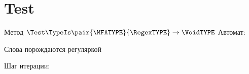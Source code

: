 \section{Test}
\begin{frame}{Метод $\Test\TypeIs\pair{\MFATYPE}{\RegexTYPE}\to\VoidTYPE$}
    Автомат:


    Слова порождаются регуляркой 

    Шаг итерации:



\end{frame}
